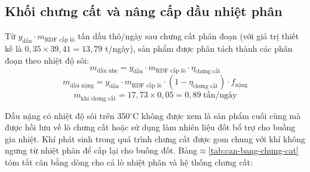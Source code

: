 \documentclass[../main.tex]{subfiles}
\begin{document}
\subsection{Khối chưng cất và nâng cấp dầu nhiệt phân}
\label{sec:khoi-chung-cat}

Từ $y_{\text{dầu}} \cdot m_{\text{RDF cấp lò}}$ tấn dầu thô/ngày sau chưng cất phân đoạn (với giá trị thiết kế là $0{,}35 \times 39{,}41 = 13{,}79$ t/ngày), sản phẩm được phân tách thành các phân đoạn theo nhiệt độ sôi:
\begin{equation}
  m_{\text{dầu nhẹ}} = y_{\text{dầu}} \cdot m_{\text{RDF cấp lò}} \cdot \eta_{\text{chưng cất}}
\end{equation}
\begin{equation}
  m_{\text{dầu nặng}} = y_{\text{dầu}} \cdot m_{\text{RDF cấp lò}} \cdot (1 - \eta_{\text{chưng cất}}) \cdot f_{\text{nặng}}
\end{equation}
\begin{equation}
  m_{\text{khí chưng cất}} = 17{,}73 \times 0{,}05 = 0{,}89 \;\text{tấn/ngày}
\end{equation}

Dầu nặng có nhiệt độ sôi trên 350$^\circ\mathrm{C}$ không được xem là sản phẩm cuối cùng mà được hồi lưu về lò chưng cất hoặc sử dụng làm nhiên liệu đốt bổ trợ cho buồng gia nhiệt. Khí phát sinh trong quá trình chưng cất được gom chung với khí không ngưng từ nhiệt phân để cấp lại cho buồng đốt. Bảng$\approx$\ref{tab:can-bang-chung-cat} tóm tắt cân bằng dòng cho cả lò nhiệt phân và hệ thống chưng cất:
\end{document}
